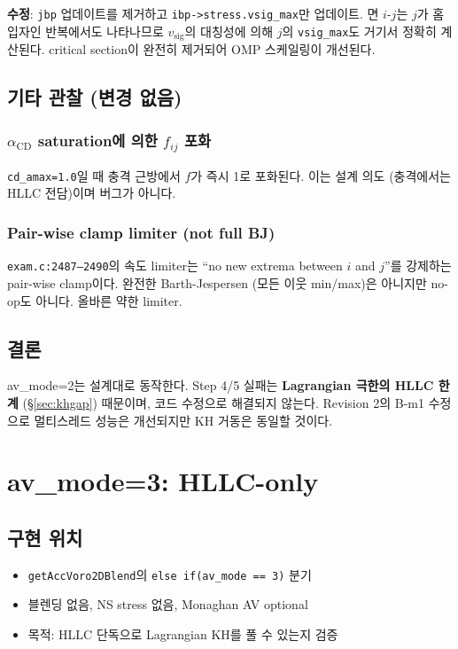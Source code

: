 \documentclass[11pt]{article}
\begin{document}
\textbf{수정}: \texttt{jbp} 업데이트를 제거하고 \texttt{ibp->stress.vsig\_max}만
업데이트. 면 $i$-$j$는 $j$가 홈 입자인 반복에서도 나타나므로 $v_\mathrm{sig}$의
대칭성에 의해 $j$의 \texttt{vsig\_max}도 거기서 정확히 계산된다. critical
section이 완전히 제거되어 OMP 스케일링이 개선된다.

\subsection{기타 관찰 (변경 없음)}

\subsubsection*{$\alpha_\mathrm{CD}$ saturation에 의한 $f_{ij}$ 포화}
\texttt{cd\_amax=1.0}일 때 충격 근방에서 $f$가 즉시 1로 포화된다. 이는
설계 의도 (충격에서는 HLLC 전담)이며 버그가 아니다.

\subsubsection*{Pair-wise clamp limiter (not full BJ)}
\texttt{exam.c:2487--2490}의 속도 limiter는 ``no new extrema between
$i$ and $j$''를 강제하는 pair-wise clamp이다. 완전한 Barth-Jespersen (모든
이웃 min/max)은 아니지만 no-op도 아니다. 올바른 약한 limiter.

\subsection{결론}
av\_mode=2는 설계대로 동작한다. Step 4/5 실패는 \textbf{Lagrangian 극한의
HLLC 한계} (\S\ref{sec:khgap}) 때문이며, 코드 수정으로 해결되지 않는다.
Revision 2의 B-m1 수정으로 멀티스레드 성능은 개선되지만 KH 거동은 동일할 것이다.


\section{av\_mode=3: HLLC-only}

\subsection{구현 위치}
\begin{itemize}
  \item \texttt{getAccVoro2DBlend}의 \texttt{else if(av\_mode == 3)} 분기
  \item 블렌딩 없음, NS stress 없음, Monaghan AV optional
  \item 목적: HLLC 단독으로 Lagrangian KH를 풀 수 있는지 검증
\end{itemize}
\end{document}
